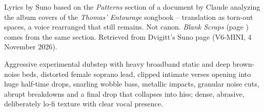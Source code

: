
\label{sec:torn-out-spaces}
\begin{notes}
Lyrics by Suno based on the \emph{Patterns} section of a document by Claude analyzing the album covers of the \emph{Thomas' Entourage} songbook -- translation as torn-out spaces, a voice rearranged that still remains. Not canon. \emph{Blank Scraps} (page \pageref{sec:blank-scraps}) comes from the same section. Retrieved from Dvigitt's Suno page (V6-MINI, 4 November 2026).
\end{notes}
\begin{style}
Aggressive experimental dubstep with heavy broadband static and deep brown-noise beds, distorted female soprano lead, clipped intimate verses opening into huge half-time drops, snarling wobble bass, metallic impacts, granular noise cuts, abrupt breakdowns and a final drop that collapses into hiss; dense, abrasive, deliberately lo-fi texture with clear vocal presence.
\end{style}
